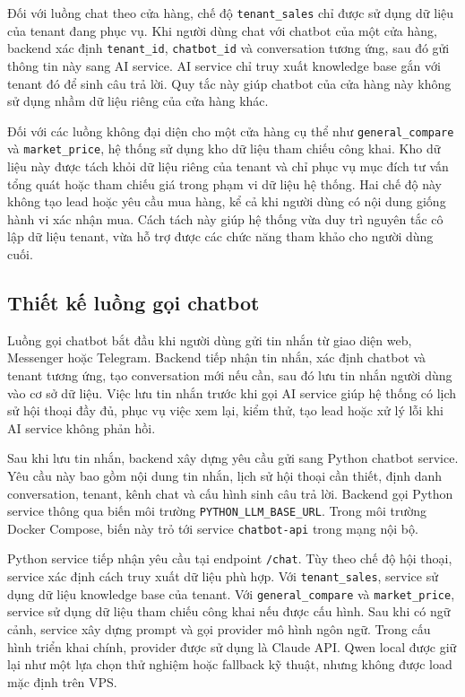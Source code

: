 \documentclass[../DoAn.tex]{subfiles}
\begin{document}
Đối với luồng chat theo cửa hàng, chế độ \texttt{tenant\_sales} chỉ được sử dụng dữ liệu của tenant đang phục vụ. Khi người dùng chat với chatbot của một cửa hàng, backend xác định \texttt{tenant\_id}, \texttt{chatbot\_id} và conversation tương ứng, sau đó gửi thông tin này sang AI service. AI service chỉ truy xuất knowledge base gắn với tenant đó để sinh câu trả lời. Quy tắc này giúp chatbot của cửa hàng này không sử dụng nhầm dữ liệu riêng của cửa hàng khác.

Đối với các luồng không đại diện cho một cửa hàng cụ thể như \texttt{general\_compare} và \texttt{market\_price}, hệ thống sử dụng kho dữ liệu tham chiếu công khai. Kho dữ liệu này được tách khỏi dữ liệu riêng của tenant và chỉ phục vụ mục đích tư vấn tổng quát hoặc tham chiếu giá trong phạm vi dữ liệu hệ thống. Hai chế độ này không tạo lead hoặc yêu cầu mua hàng, kể cả khi người dùng có nội dung giống hành vi xác nhận mua. Cách tách này giúp hệ thống vừa duy trì nguyên tắc cô lập dữ liệu tenant, vừa hỗ trợ được các chức năng tham khảo cho người dùng cuối.

\subsection{Thiết kế luồng gọi chatbot}

Luồng gọi chatbot bắt đầu khi người dùng gửi tin nhắn từ giao diện web, Messenger hoặc Telegram. Backend tiếp nhận tin nhắn, xác định chatbot và tenant tương ứng, tạo conversation mới nếu cần, sau đó lưu tin nhắn người dùng vào cơ sở dữ liệu. Việc lưu tin nhắn trước khi gọi AI service giúp hệ thống có lịch sử hội thoại đầy đủ, phục vụ việc xem lại, kiểm thử, tạo lead hoặc xử lý lỗi khi AI service không phản hồi.

Sau khi lưu tin nhắn, backend xây dựng yêu cầu gửi sang Python chatbot service. Yêu cầu này bao gồm nội dung tin nhắn, lịch sử hội thoại cần thiết, định danh conversation, tenant, kênh chat và cấu hình sinh câu trả lời. Backend gọi Python service thông qua biến môi trường \texttt{PYTHON\_LLM\_BASE\_URL}. Trong môi trường Docker Compose, biến này trỏ tới service \texttt{chatbot-api} trong mạng nội bộ.

Python service tiếp nhận yêu cầu tại endpoint \texttt{/chat}. Tùy theo chế độ hội thoại, service xác định cách truy xuất dữ liệu phù hợp. Với \texttt{tenant\_sales}, service sử dụng dữ liệu knowledge base của tenant. Với \texttt{general\_compare} và \texttt{market\_price}, service sử dụng dữ liệu tham chiếu công khai nếu được cấu hình. Sau khi có ngữ cảnh, service xây dựng prompt và gọi provider mô hình ngôn ngữ. Trong cấu hình triển khai chính, provider được sử dụng là Claude API. Qwen local được giữ lại như một lựa chọn thử nghiệm hoặc fallback kỹ thuật, nhưng không được load mặc định trên VPS.
\end{document}
